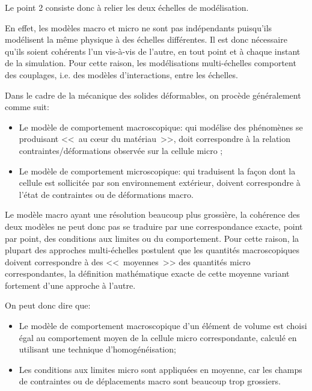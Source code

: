 \medskip
Le point 2 consiste donc à relier les deux échelles de modélisation.

En effet, les modèles macro et micro ne sont pas indépendants puisqu'ils
modélisent la même physique à des échelles différentes.
Il est donc nécessaire qu'ils soient cohérents l'un vis-à-vis de l'autre, en tout point et à
chaque instant de la simulation.
Pour cette raison, les modélisations multi-échelles comportent des couplages, i.e. des
modèles d'interactions, entre les échelles.

Dans le cadre de la mécanique des solides déformables, on procède
généralement comme suit:
\begin{itemize}
   \item Le modèle de comportement macroscopique:
	qui modélise des phénomènes se produisant <<~au cœur du matériau~>>,
	doit correspondre à la relation contraintes/déformations observée sur la cellule micro ;

   \item Le modèle de comportement microscopique:
	qui traduisent la façon dont la cellule est sollicitée par son environnement
 	extérieur, doivent correspondre à l'état de contraintes ou de déformations macro.
\end{itemize}

Le modèle macro ayant une résolution beaucoup plus grossière, la cohérence des deux
modèles ne peut donc pas se traduire par une correspondance exacte, point par point, des
conditions aux limites ou du comportement. Pour cette raison, la plupart des approches
multi-échelles postulent que les quantités macroscopiques doivent correspondre à des
<<~moyennes~>> des quantités micro correspondantes,  la définition mathématique exacte de
cette moyenne variant fortement d'une approche à l'autre.

\medskip
{} On peut donc dire que:
\begin{itemize}
   \item Le modèle de comportement macroscopique d'un élément de volume est choisi
	égal au comportement moyen de la cellule micro correspondante, calculé en utilisant
	une technique d'homogénéisation;

   \item Les conditions aux limites micro sont appliquées en moyenne, car les champs de
	contraintes ou de déplacements macro sont beaucoup trop grossiers.
\end{itemize}

